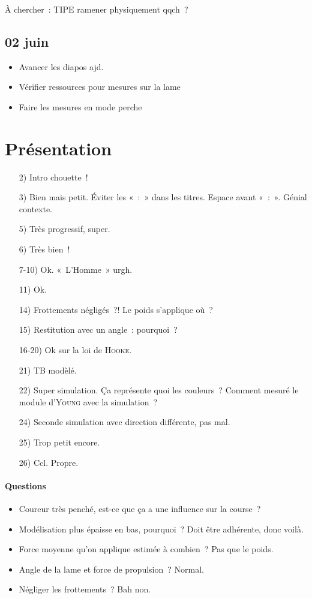 \documentclass[a4paper, 11pt, final, garamond]{book}
\begin{document}
À chercher~: TIPE ramener physiquement qqch~?

\subsection{02 juin}
\begin{itemize}
  \item Avancer les diapos ajd.
  \item Vérifier ressources pour mesures sur la lame
  \item Faire les mesures en mode perche
\end{itemize}

\section{Présentation}

\begin{enumerate}
  \item[2)] Intro chouette~!
  \item[3)] Bien mais petit. Éviter les «~:~» dans les titres. Espace avant
    «~:~». Génial contexte.
  \item[5)] Très progressif, super.
  \item[6)] Très bien~!
  \item[7-10)] Ok. «~L'Homme~» urgh.
  \item[11)] Ok.
  \item[14)] Frottements négligés~?! Le poids s'applique où~?
  \item[15)] Restitution avec un angle~: pourquoi~?
  \item[16-20)] Ok sur la loi de \textsc{Hooke}.
  \item[21)] TB modèlé.
  \item[22)] Super simulation. Ça représente quoi les couleurs~? Comment mesuré
    le module d'\textsc{Young} avec la simulation~?
  \item[24)] Seconde simulation avec direction différente, pas mal.
  \item[25)] Trop petit encore.
  \item[26)] Ccl. Propre.
\end{enumerate}

\paragraph*{Questions}
\begin{itemize}
  \item Coureur très penché, est-ce que ça a une influence sur la course~?
  \item Modélisation plus épaisse en bas, pourquoi~? Doit être adhérente, donc
    voilà.
  \item Force moyenne qu'on applique estimée à combien~? Pas que le poids.
  \item Angle de la lame et force de propulsion~? Normal.
  \item Négliger les frottements~? Bah non.
\end{itemize}
\end{document}
